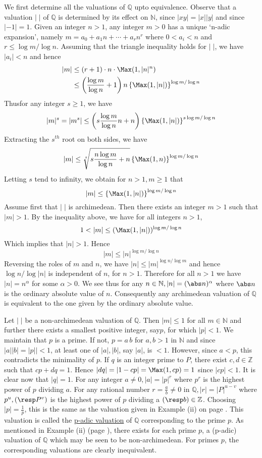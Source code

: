 We first determine all the valuations of $\mathbb{Q}$ upto 
equivalence. Observe that a valuation $|\;|$ of $\mathbb{Q}$ is 
determined by its effect on $\mathbb{N}$, since $|xy|=|x||y|$ and 
since $|-1|=1$. Given an integer $n>1$, any integer $m>0$ has a unique 
`n-adic expansion', namely $m=a_0+a_1 n+\cdots + a_rn^r$ where 
$0<a_i<n$ and $r\leq\log m/\log n$. Assuming that the triangle 
inequality holds for $|\;|$, we have $|a_i|<n$ and hence 
\begin{align*}
|m| & \leq (r+1)\cdot n\cdot\Max(1, |n|^n)\\
& \leq\left(\frac{\log m}{\log 
n}+1\right)n\left\{\Max(1,|n|)\right\}^{\log m / \log n}
\end{align*}
Thus\pageoriginale for any integer $s\geq 1$, we have
$$
|m|^s=|m^s|\leq\left(s\frac{\log m}{\log 
n}n+n\right)\left\{\Max(1,|n|)\right\}^{s\log m/\log n}
$$
Extracting the $s^{th}$ root on both sides, we have
$$
|m|\leq\sqrt[s]{s\frac{n\log m}{\log n}+n}\left\{\Max 
(1,n)\right\}^{\log m/\log n}
$$
Letting $s$ tend to infinity, we obtain for $n>1,m\geq 1$ that
$$
|m|\leq\left\{\Max(1,|n|)\right\}^{\log m/\log n}
$$
Assume first that $|\;|$ is archimedean. Then there exists an integer 
$m>1$ such that $|m|>1$. By the inequality above, we have for all 
integers $n>1$,
$$
1<|m|\leq(\Max(1,|n|))^{\log m/\log n}
$$
Which implies that $|n|>1$. Hence
$$
|m|\leq|n|^{\log m/\log n}
$$
Reversing the roles of $m$ and $n$, we have $|n|\leq|m|^{\log n/\log 
m}$ and hence $\log n/\log |n|$ is independent of $n$, for $n>1$. Therefore 
for all $n>1$ we have $|n|=n^\alpha$ for some $\alpha>0$. We see thus 
for any $n\in\mathbb{N},|n|=(\abs n)^\alpha$ where $\abs n$ is the 
ordinary absolute value of $n$. Consequently any archimedean valuation 
of $\mathbb{Q}$ is equivalent to the one given by the ordinary 
absolute value.

Let $|\;|$ be a non-archimedean valuation of $\mathbb{Q}$. Then 
$|m|\leq 1$ for all $m\in\mathbb{N}$ and further there exists a 
smallest positive integer, say\pageoriginale $p$, for which $|p|<1$. 
We maintain that $p$ is a prime. If not, $p=a\, b$ for $a,b>1$ in 
$\mathbb{N}$ and since $|a||b|=|p||<1$, at least one of $|a|,|b|$, say 
$|a|$, is $<1$. However, since $a<p$, this contradicts the minimality 
of $p$. If $q$ is an integer prime to $P$, there exist 
$c,d\in\mathbb{Z}$ such that $cp+dq=1$. Hence 
$|dq|=|1-cp|=\Max(1,cp)=1$ since $|cp|<1$. It is clear now that 
$|q|=1$. For any integer $a\neq 0, |a|=|p|^r$ where $p^r$ is the 
highest power of $p$ dividing $a$. For any rational number 
$r=\frac{a}{b}\neq 0$ in $\mathbb{Q}, |r|=|P|^{u-v}$ where $p^u, 
(\resp P^v)$ is the highest power of $p$ dividing a $(\resp 
b)\in\mathbb{Z}$. Choosing $|p|=\frac{1}{p}$, this is the same as the 
valuation given in Example (ii) on page \pageref{ex:ii}. This valuation 
is called the \underline{p-adic valuation} of $\mathbb{Q}$ 
corresponding to the prime $p$. As mentioned in Example (ii) (page 
\pageref{ex:ii}), there exists for each prime $p$, a (p-adic) valuation 
of $\mathbb{Q}$ which may be seen to be non-archimedean. For primes 
$p$, the corresponding valuations are clearly inequivalent.

